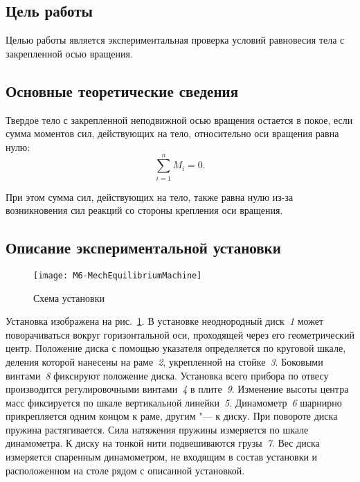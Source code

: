 \documentclass[a4paper, 12pt]{extarticle}
\newcommand{\isum}{\sum\limits_{i=1}^{n}}
\begin{document}
\MTDTitlePage
\MTDInfoPage

\setcounter{section}{6}

\subsection{Цель работы}
Целью работы является экспериментальная проверка условий равновесия тела с закрепленной осью вращения.

\subsection{Основные теоретические сведения}
Твердое тело с закрепленной неподвижной осью вращения остается в  покое, если сумма моментов сил, действующих на тело, относительно оси вращения равна нулю:
\begin{equation}
\label{eq:m6-moment}
\isum M_i = 0. %
\end{equation}

При этом сумма сил, действующих на тело, также равна нулю из-за возникновения сил реакций со стороны крепления оси вращения.

\subsection{Описание экспериментальной установки}

\begin{figure}[h]
\begin{center}
\texttt{[image: M6-MechEquilibriumMachine]}
\end{center}
\caption{Схема установки \label{fig:m6-disk-device}}
\end{figure}

Установка изображена на рис.~\ref{fig:m6-disk-device}. В установке неоднородный диск~\emph{1} может поворачиваться вокруг горизонтальной оси, проходящей через его геометрический центр. Положение диска с помощью указателя определяется по круговой шкале, деления которой нанесены на раме~\emph{2}, укрепленной на стойке~\emph{3}. Боковыми винтами~\emph{8} фиксируют положение диска.  Установка всего прибора по отвесу производится регулировочными винтами~\emph{4} в плите~\emph{9}. Изменение высоты центра масс фиксируется по шкале вертикальной линейки~\emph{5}. Динамометр~\emph{6} шарнирно прикрепляется одним концом к раме, другим "--- к диску. При повороте диска пружина растягивается. Сила натяжения пружины измеряется по шкале динамометра. К диску на тонкой нити подвешиваются грузы~\emph{7}. Вес диска измеряется спаренным динамометром, не входящим в состав установки и расположенном на столе рядом с описанной  установкой. %
\end{document}

